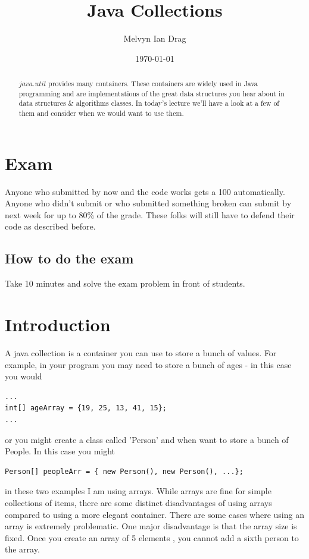 \documentclass[12pt]{article}
\title{Java Collections}
\author{
	Melvyn Ian Drag
}
\date{\today}
\begin{document}
\maketitle

\begin{abstract}
$java.util$ provides many containers. These containers are widely used in Java programming and are implementations of the great data structures you hear about in data structures \& algorithms classes. In today's lecture we'll have a look at a few of them and consider when we would want to use them.
\end{abstract}

\section{Exam}
Anyone who submitted by now and the code works gets a 100 automatically. Anyone who didn't submit or who submitted something broken can submit by next week for up to 80\% of the grade. These folks will still have to defend their code as described before.

\subsection{How to do the exam}
Take 10 minutes and solve the exam problem in front of students.

\section{Introduction}
A java collection is a container you can use to store a bunch of values. For example, in your program you may need to store a bunch of ages - in this case you would

\begin{lstlisting}
...
int[] ageArray = {19, 25, 13, 41, 15};
...
\end{lstlisting} 

or you might create a class called 'Person' and when want to store a bunch of People. In this case you might

\begin{lstlisting}
Person[] peopleArr = { new Person(), new Person(), ...};
\end{lstlisting}

in these two examples I am using arrays. While arrays are fine for simple collections of items, there are some distinct disadvantages of using arrays compared to using a more elegant container. There are some cases where using an array is extremely problematic. One major disadvantage is that the array size is fixed. Once you create an array of 5  elements , you cannot add a sixth person to the array.  
\end{document}
